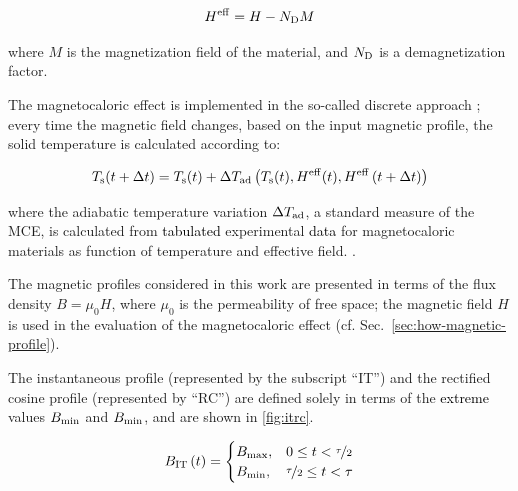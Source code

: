 \documentclass[referee]{svjour3}
\begin{document}
\begin{equation}
  \label{eq:6}
  H^{\mathrm{eff}} = H - N_{\mathrm{D}} M
\end{equation}


\noindent where $M$ is the magnetization field of the material, and $N_{\mathrm{D}}$ is a demagnetization factor.

The magnetocaloric effect is implemented in the so-called discrete approach \cite{bib:nielsen11_review}; every time the magnetic field changes, based on the input magnetic profile, the solid temperature is calculated according to:

\begin{equation}
  \label{eq:89}
  T_{\mathrm{s}}(t + \Delta{}t) = T_{\mathrm{s}}(t) + \Delta{}T_{\mathrm{ad}} \left(T_{\mathrm{s}}(t),H^{\mathrm{eff}}(t),H^{\mathrm{eff}}\left(t + \Delta{}t\right)\right)
\end{equation}



\noindent where the adiabatic temperature variation $\Delta{}T_{\mathrm{ad}}$, a standard measure of the MCE, is calculated from \textcolor{black}{tabulated} experimental \textcolor{black}{data} for magnetocaloric materials as function of temperature and effective field. \cite{bib:trevizoli16_perfor_model}.

The magnetic profiles considered in this work are presented in terms of the flux density $B = \mu_0 H$, where $\mu_0$ is the permeability of free space; the magnetic field $H$ is used in the evaluation of the magnetocaloric effect (cf. Sec.~\ref{sec:how-magnetic-profile}).

The instantaneous profile (represented by the subscript ``IT'') and the rectified cosine profile (represented by ``RC'') are defined solely in terms of the \textcolor{black}{extreme} values $B_{\mathrm{min}}$ and $B_{\mathrm{min}}$, and are shown in \autoref{fig:itrc}.


\begin{equation}
{B}_{\mathrm{IT}}\,(t)=
\begin{cases}
{B}_{\mathrm{max}}, & 0 \le t < \nicefrac{\tau}{2} \\
{B}_{\mathrm{min}}, & \nicefrac{\tau}{2} \le t < \tau\\
\end{cases}
\label{eq:199}
\end{equation}
\end{document}
